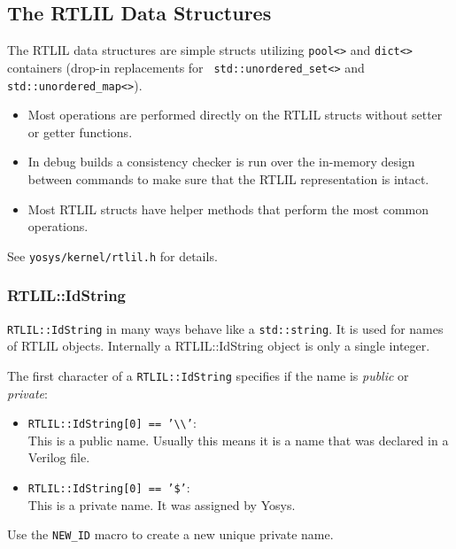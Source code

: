 
\subsection{The RTLIL Data Structures}

\begin{frame}{\subsecname}
The RTLIL data structures are simple structs utilizing {\tt pool<>} and
{\tt dict<>} containers (drop-in replacements for {\tt
std::unordered\_set<>} and {\tt std::unordered\_map<>}).

\bigskip
\begin{itemize}
\item Most operations are performed directly on the RTLIL structs without
setter or getter functions.

\bigskip
\item In debug builds a consistency checker is run over the in-memory design
between commands to make sure that the RTLIL representation is intact.

\bigskip
\item Most RTLIL structs have helper methods that perform the most common operations.
\end{itemize}

\bigskip
See {\tt yosys/kernel/rtlil.h} for details.
\end{frame}

\subsubsection{RTLIL::IdString}

\begin{frame}{\subsubsecname}{}
{\tt RTLIL::IdString} in many ways behave like a {\tt std::string}. It is used
for names of RTLIL objects. Internally a RTLIL::IdString object is only a
single integer.

\medskip
The first character of a {\tt RTLIL::IdString} specifies if the name is {\it public\/} or {\it private\/}:

\medskip
\begin{itemize}
\item {\tt RTLIL::IdString[0] == '\textbackslash\textbackslash'}: \\
This is a public name. Usually this means it is a name that was declared in a Verilog file.

\bigskip
\item {\tt RTLIL::IdString[0] == '\$'}: \\
This is a private name. It was assigned by Yosys.
\end{itemize}

\bigskip
Use the {\tt NEW\_ID} macro to create a new unique private name.
\end{frame}

